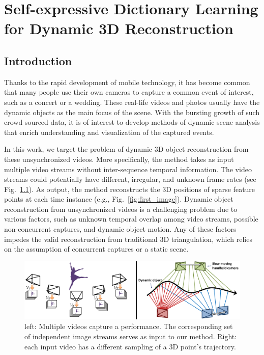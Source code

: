 \chapter{Self-expressive Dictionary Learning for Dynamic 3D Reconstruction}

\section{Introduction}

Thanks to the rapid development of mobile technology, it has become common that many people use their own cameras to capture a common event of interest, such as a concert or a wedding. These real-life videos and photos usually have the dynamic objects as the main focus of the scene. With the bursting growth of such crowd sourced data, it is of interest to develop methods of dynamic scene analysis that enrich understanding and visualization of the captured events.

In this work, we target the problem of dynamic 3D object reconstruction from these unsynchronized videos. 
More specifically, the method takes as input multiple video streams without inter-sequence temporal information. The video streams could potentially have different, irregular, and unknown frame rates (see Fig.~\ref{fig:overview}). 
As output, the method reconstructs the 3D positions of sparse feature points at each time instance (e.g., Fig.~\ref{fig:first_image}). 
Dynamic object reconstruction from unsynchronized videos is a challenging problem due to various factors, such as unknown temporal overlap among video streams, possible non-concurrent captures, and dynamic object motion. Any of these factors impedes the valid reconstruction from traditional 3D triangulation, which relies on the assumption of concurrent captures or a static scene.



\begin{figure}
\centering
\includegraphics[width=1\textwidth]{chapter5/resource/overview_1_cropped.pdf}
\caption{\label{fig:overview} left: Multiple videos capture a performance.
The corresponding set of independent image streams  serves as input to our method.
Right: each input video has a different sampling of a 3D point's trajectory.}
\end{figure}


